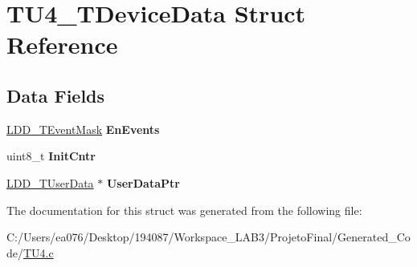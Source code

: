 \hypertarget{struct_t_u4___t_device_data}{\section{T\-U4\-\_\-\-T\-Device\-Data Struct Reference}
\label{struct_t_u4___t_device_data}
}
\subsection*{Data Fields}
\begin{DoxyCompactItemize}
\item 
\hypertarget{struct_t_u4___t_device_data_a9abfcca255635e2e79b13a84ae12c0b5}{\hyperlink{group___p_e___types__module_gafbe7f4d4e51560399c3bdd0218584533}{L\-D\-D\-\_\-\-T\-Event\-Mask} {\bfseries En\-Events}}\label{struct_t_u4___t_device_data_a9abfcca255635e2e79b13a84ae12c0b5}

\item 
\hypertarget{struct_t_u4___t_device_data_a6f3bfe17de19dfb0a46a5a7b830a20b4}{uint8\-\_\-t {\bfseries Init\-Cntr}}\label{struct_t_u4___t_device_data_a6f3bfe17de19dfb0a46a5a7b830a20b4}

\item 
\hypertarget{struct_t_u4___t_device_data_aa681aa081617106f4766215cb1702263}{\hyperlink{group___p_e___types__module_ga0b66a73f87238a782318aa0be7578e35}{L\-D\-D\-\_\-\-T\-User\-Data} $\ast$ {\bfseries User\-Data\-Ptr}}\label{struct_t_u4___t_device_data_aa681aa081617106f4766215cb1702263}

\end{DoxyCompactItemize}


The documentation for this struct was generated from the following file\-:\begin{DoxyCompactItemize}
\item 
C\-:/\-Users/ea076/\-Desktop/194087/\-Workspace\-\_\-\-L\-A\-B3/\-Projeto\-Final/\-Generated\-\_\-\-Code/\hyperlink{_t_u4_8c}{T\-U4.\-c}\end{DoxyCompactItemize}

